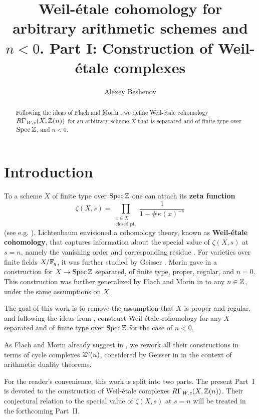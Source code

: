 \documentclass{article}
\title{Weil-étale cohomology for arbitrary arithmetic schemes and $n < 0$.
  Part I: Construction of Weil-étale complexes}
\author{Alexey Beshenov}
\numberwithin{equation}{section}
\begin{document}
\maketitle

\begin{abstract}
  Following the ideas of Flach and Morin \cite{Flach-Morin-2018}, we define
  Weil-étale cohomology $R\Gamma_{\text{\it W,c}} (X, \mathbb{Z} (n))$ for an arbitrary scheme $X$
  that is separated and of finite type over $\operatorname{Spec} \mathbb{Z}$, and $n < 0$.
\end{abstract}

\tableofcontents


\section{Introduction}

To a scheme $X$ of finite type over $\operatorname{Spec} \mathbb{Z}$ one can attach its
\textbf{zeta function}
$$\zeta (X,s) = \prod_{\substack{x \in X \\ \text{closed pt.}}} \frac{1}{1 - \#\kappa (x)^{-s}}$$
(see e.g. \cite{Serre-1965}). Lichtenbaum envisioned a cohomology theory, known
as \textbf{Weil-étale cohomology}, that captures information about the special
value of $\zeta (X,s)$ at $s = n$, namely the vanishing order and corresponding
residue
\cite{Lichtenbaum-2005,Lichtenbaum-2009-number-rings,Lichtenbaum-2009-Euler-char}.
For varieties over finite fields $X/\mathbb{F}_q$, it was further studied by Geisser
\cite{Geisser-2004,Geisser-2006,Geisser-2010-arithmetic-homology}.
Morin gave in \cite{Morin-2014} a construction for $X \to \operatorname{Spec}\mathbb{Z}$ separated,
of finite type, proper, regular, and $n = 0$. This construction was further
generalized by Flach and Morin in \cite{Flach-Morin-2018} to any $n \in \mathbb{Z}$,
under the same assumptions on $X$.

The goal of this work is to remove the assumption that $X$ is proper and
regular, and following the ideas from \cite{Flach-Morin-2018}, construct
Weil-étale cohomology for any $X$ separated and of finite type over $\operatorname{Spec}\mathbb{Z}$
for the case of $n < 0$.

As Flach and Morin already suggest in \cite[Remark 3.11]{Flach-Morin-2018},
we rework all their constructions in terms of cycle complexes $\mathbb{Z}^c (n)$,
considered by Geisser in \cite{Geisser-2010} in the context of arithmetic
duality theorems.

For the reader's convenience, this work is split into two parts. The present
Part~I is devoted to the construction of Weil-étale complexes
$R\Gamma_{\text{\it W,c}} (X, \mathbb{Z} (n))$. Their conjectural relation to the special value
of $\zeta (X,s)$ at $s = n$ will be treated in the forthcoming Part~II.
\end{document}
